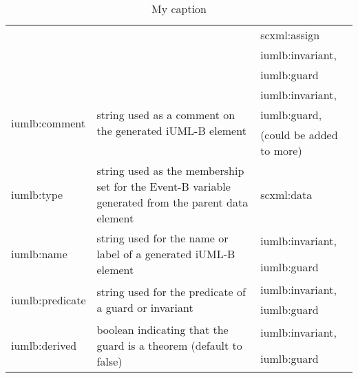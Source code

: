 \documentclass{easychair}
\begin{document}
\begin{table}[tbp]
{\begin{tabular}{|l|l|l|}
                                   &                                                                                                                            & scxml:assign             \\
                                   &                                                                                                                            & iumlb:invariant,         \\
                                   &                                                                                                                            & iumlb:guard              \\ \hline
\multirow{3}{*}{iumlb:comment}     & \multirow{3}{*}{string used as a comment on the generated iUML-B element}                                                  & iumlb:invariant,         \\
                                   &                                                                                                                            & iumlb:guard,             \\
                                   &                                                                                                                            & (could be added to more) \\ \hline
iumlb:type                         & string used as the membership set for the Event-B variable generated from the parent data element                          & scxml:data               \\ \hline
\multirow{2}{*}{iumlb:name}        & \multirow{2}{*}{string used for the name or label of a generated iUML-B element}                                           & iumlb:invariant,         \\
                                   &                                                                                                                            & iumlb:guard              \\ \hline
\multirow{2}{*}{iumlb:predicate}   & \multirow{2}{*}{string used for the predicate of a guard or invariant}                                                     & iumlb:invariant,         \\
                                   &                                                                                                                            & iumlb:guard              \\ \hline
\multirow{2}{*}{iumlb:derived}     & \multirow{2}{*}{boolean indicating that the guard is a theorem (default to false)}                                         & iumlb:invariant,         \\
                                   &                                                                                                                            & iumlb:guard              \\ \hline
\end{tabular}%
}
\caption{My caption}
\label{my-label}
\end{table}
\end{document}
